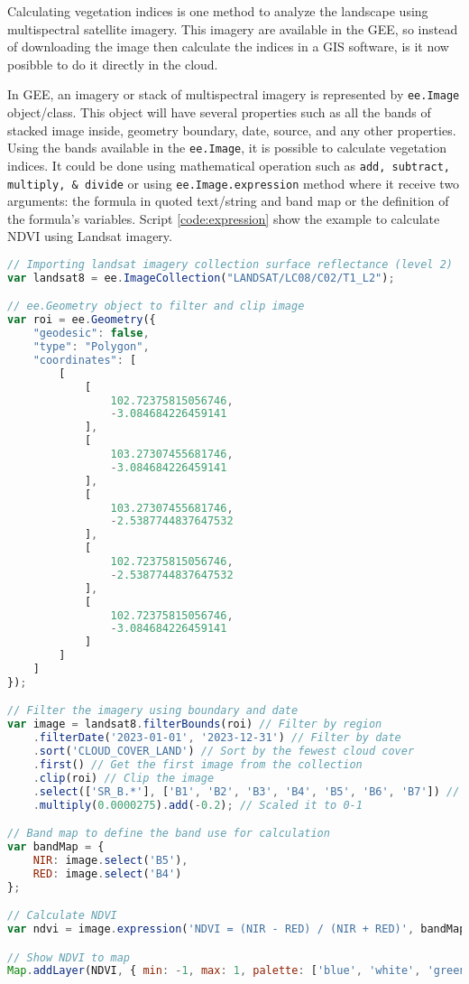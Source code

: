 Calculating vegetation indices is one method to analyze the landscape using multispectral satellite imagery. This imagery are available in the GEE, so instead of downloading the image then calculate the indices in a GIS software, is it now posibble to do it directly in the cloud. 

In GEE, an imagery or stack of multispectral imagery is represented by \verb|ee.Image| object/class. This object will have several properties such as all the bands of stacked image inside, geometry boundary, date, source, and any other properties. Using the bands available in the \verb|ee.Image|, it is possible to calculate vegetation indices. It could be done using mathematical operation such as \verb|add, subtract, multiply, & divide| or using \verb|ee.Image.expression| method where it receive two arguments: the formula in quoted text/string and band map or the definition of the formula's variables. Script \ref{code:expression} show the example to calculate NDVI using Landsat imagery.

\begin{lstlisting}[language=JavaScript, label={code:expression}, caption={GEE script to calculate NDVI from Landsat 8 OLI imagery}]
// Importing landsat imagery collection surface reflectance (level 2)
var landsat8 = ee.ImageCollection("LANDSAT/LC08/C02/T1_L2");

// ee.Geometry object to filter and clip image
var roi = ee.Geometry({
	"geodesic": false,
	"type": "Polygon",
	"coordinates": [
		[
			[
				102.72375815056746,
				-3.084684226459141
			],
			[
				103.27307455681746,
				-3.084684226459141
			],
			[
				103.27307455681746,
				-2.5387744837647532
			],
			[
				102.72375815056746,
				-2.5387744837647532
			],
			[
				102.72375815056746,
				-3.084684226459141
			]
		]
	]
});

// Filter the imagery using boundary and date
var image = landsat8.filterBounds(roi) // Filter by region
	.filterDate('2023-01-01', '2023-12-31') // Filter by date
	.sort('CLOUD_COVER_LAND') // Sort by the fewest cloud cover
	.first() // Get the first image from the collection
	.clip(roi) // Clip the image
	.select(['SR_B.*'], ['B1', 'B2', 'B3', 'B4', 'B5', 'B6', 'B7']) // Select only useful bands
	.multiply(0.0000275).add(-0.2); // Scaled it to 0-1

// Band map to define the band use for calculation
var bandMap = {
	NIR: image.select('B5'),
	RED: image.select('B4')
};

// Calculate NDVI
var ndvi = image.expression('NDVI = (NIR - RED) / (NIR + RED)', bandMap);

// Show NDVI to map
Map.addLayer(NDVI, { min: -1, max: 1, palette: ['blue', 'white', 'green'] }, 'NDVI');
\end{lstlisting}

